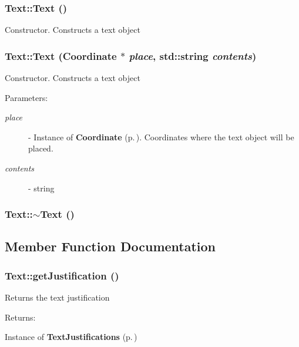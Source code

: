 \subsubsection{\setlength{\rightskip}{0pt plus 5cm}Text::Text ()}\label{classText_a0}


Constructor. Constructs a text object 
\subsubsection{\setlength{\rightskip}{0pt plus 5cm}Text::Text ({\bf Coordinate} $\ast$ {\em place}, std::string {\em contents})}\label{classText_a1}


Constructor. Constructs a text object \begin{Desc}
\item[Parameters: ]\par
\begin{description}
\item[{\em 
place}]- Instance of {\bf Coordinate} {\rm (p.\,\pageref{classCoordinate})}. Coordinates where the text object will be placed. \item[{\em 
contents}]- string \end{description}
\end{Desc}
\subsubsection{\setlength{\rightskip}{0pt plus 5cm}Text::$\sim$Text ()}\label{classText_a2}




\subsection{Member Function Documentation}
\subsubsection{ Text::get\-Justification ()\hspace{0.3cm}{\tt  [inline]}}\label{classText_a4}


Returns the text justification \begin{Desc}
\item[Returns: ]\par
Instance of {\bf Text\-Justifications} {\rm (p.\,\pageref{classText_s3})} \end{Desc}
